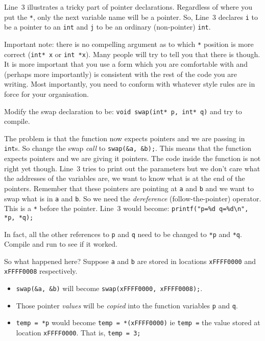 Line~3 illustrates a tricky part of pointer declarations.
Regardless of where you put the \texttt{*}, only the next variable name will be a pointer.
So, Line~3 declares \texttt{i} to be a pointer to an \texttt{int} and \texttt{j} to be an ordinary (non-pointer) \texttt{int}.

Important note:
there is no compelling argument as to which \texttt{*} position is more correct (\texttt{int* x} or \texttt{int *x}).
Many people will try to tell you that there is though.
It is more important that you use a form which you are comfortable with and (perhaps more importantly) is consistent with 
the rest of the code you are writing.
Most importantly, you need to conform with whatever style rules are in force for your organisation.

Modify the swap declaration to be:
\lstinline!void swap(int* p, int* q)!
and try to compile.

The problem is that the function now expects pointers and we are passing in \texttt{int}s.
So change the swap \emph{call} to \lstinline!swap(&a, &b);!.
This means that the function expects pointers and we are giving it pointers.
The code inside the function is not right yet though.
Line~3 tries to print out the parameters but we don't care what the addresses of the variables are, we want to know what is
at the end of the pointers.
Remember that these pointers are pointing at \texttt{a} and \texttt{b} and we want to swap what is in \texttt{a} and \texttt{b}.
So we need the \emph{dereference} (follow-the-pointer) operator.
This is a \texttt{*} before the pointer.
Line~3 would become:
\lstinline!printf("p=%d q=%d\n", *p, *q);!

In fact, all the other references to \texttt{p} and \texttt{q} need to be changed to \texttt{*p} and \texttt{*q}.
Compile and run to see if it worked.

So what happened here?
Suppose \texttt{a} and \texttt{b} are stored in locations \lstinline{xFFFF0000} and \lstinline{xFFFF0008} respectively.
\begin{itemize}
 \item \lstinline{swap(&a, &b)} will become \lstinline{swap(xFFFF0000, xFFFF0008);}.
 \item Those pointer \emph{values} will be \emph{copied} into the function variables \texttt{p} and \texttt{q}.
 \item \lstinline!temp = *p! would become \lstinline!temp = *(xFFFF0000)! ie \texttt{temp =} the value stored at location 
 \lstinline!xFFFF0000!.  That is, \lstinline!temp = 3;!
\end{itemize}


